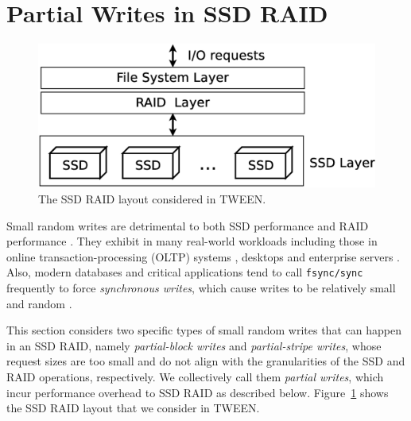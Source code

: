 \section{Partial Writes in SSD RAID}
\label{sec:partial}

\begin{figure}[t]
\centering
\includegraphics[width=0.8\linewidth]{figs/typical_raid}
\caption{The SSD RAID layout considered in TWEEN.}
\label{fig:typicalraid}
\end{figure}

Small random writes are detrimental to both SSD performance
\cite{kim08,chen09,min12} and RAID performance \cite{stodolsky93}.  They exhibit
in many real-world workloads including those in online transaction-processing
(OLTP) systems \cite{wong02}, desktops \cite{harter11} and enterprise servers
\cite{kavalanekar08}. Also, modern databases and critical applications tend to
call \texttt{fsync/sync} frequently to force {\em synchronous writes}, which
cause writes to be relatively small and random \cite{harter11}.
	   
	
This section considers two specific types of small random writes that can happen
in an SSD RAID, namely {\em partial-block writes} and {\em partial-stripe
    writes}, whose request sizes are too small and do not align with the
granularities of the SSD and RAID operations, respectively. We collectively call
them {\em partial writes}, which incur performance overhead to SSD RAID as
described below.  Figure~\ref{fig:typicalraid} shows the SSD RAID layout that we
consider in TWEEN.



